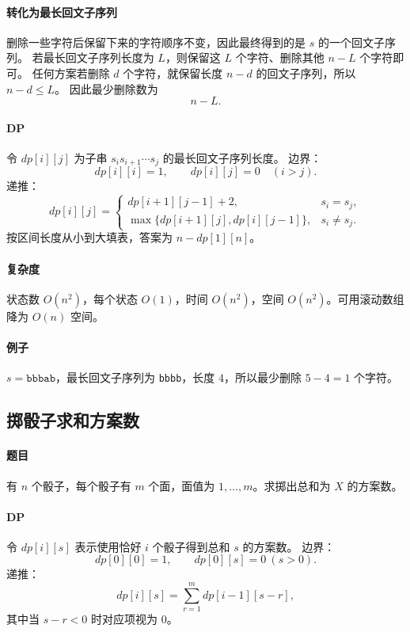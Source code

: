\documentclass[UTF8,openany,12pt]{ctexbook}
\theoremstyle{remark}
\begin{document}
\paragraph{转化为最长回文子序列}
删除一些字符后保留下来的字符顺序不变，因此最终得到的是 $s$ 的一个回文子序列。
若最长回文子序列长度为 $L$，则保留这 $L$ 个字符、删除其他 $n-L$ 个字符即可。
任何方案若删除 $d$ 个字符，就保留长度 $n-d$ 的回文子序列，所以 $n-d\le L$。
因此最少删除数为
\[
  n-L.
\]

\paragraph{DP}
令 $dp[i][j]$ 为子串 $s_i s_{i+1}\cdots s_j$ 的最长回文子序列长度。
边界：
\[
  dp[i][i]=1,\qquad dp[i][j]=0\quad(i>j).
\]
递推：
\[
dp[i][j]=
\begin{cases}
  dp[i+1][j-1]+2, & s_i=s_j,\\
  \max\{dp[i+1][j],dp[i][j-1]\}, & s_i\ne s_j.
\end{cases}
\]
按区间长度从小到大填表，答案为 $n-dp[1][n]$。

\paragraph{复杂度}
状态数 $O(n^2)$，每个状态 $O(1)$，时间 $O(n^2)$，空间 $O(n^2)$。可用滚动数组降为
$O(n)$ 空间。

\paragraph{例子}
$s=\texttt{bbbab}$，最长回文子序列为 \texttt{bbbb}，长度 $4$，所以最少删除
$5-4=1$ 个字符。

\subsection{掷骰子求和方案数}

\paragraph{题目}
有 $n$ 个骰子，每个骰子有 $m$ 个面，面值为 $1,\dots,m$。求掷出总和为 $X$ 的方案数。

\paragraph{DP}
令 $dp[i][s]$ 表示使用恰好 $i$ 个骰子得到总和 $s$ 的方案数。
边界：
\[
  dp[0][0]=1,\qquad dp[0][s]=0\ (s>0).
\]
递推：
\[
  dp[i][s]=\sum_{r=1}^{m} dp[i-1][s-r],
\]
其中当 $s-r<0$ 时对应项视为 $0$。
\end{document}
